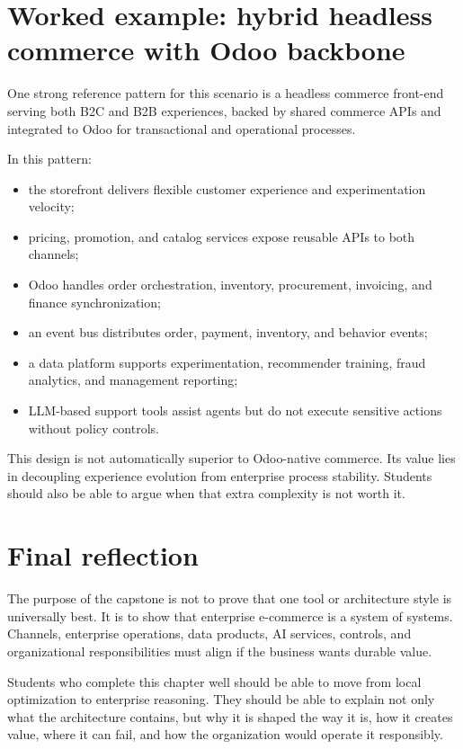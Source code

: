 \section{Worked example: hybrid headless commerce with Odoo backbone}
One strong reference pattern for this scenario is a headless commerce front-end serving both B2C and B2B experiences, backed by shared commerce APIs and integrated to Odoo for transactional and operational processes.

In this pattern:
\begin{itemize}
  \item the storefront delivers flexible customer experience and experimentation velocity;
  \item pricing, promotion, and catalog services expose reusable APIs to both channels;
  \item Odoo handles order orchestration, inventory, procurement, invoicing, and finance synchronization;
  \item an event bus distributes order, payment, inventory, and behavior events;
  \item a data platform supports experimentation, recommender training, fraud analytics, and management reporting;
  \item LLM-based support tools assist agents but do not execute sensitive actions without policy controls.
\end{itemize}

This design is not automatically superior to Odoo-native commerce. Its value lies in decoupling experience evolution from enterprise process stability. Students should also be able to argue when that extra complexity is not worth it.

\section{Final reflection}
The purpose of the capstone is not to prove that one tool or architecture style is universally best. It is to show that enterprise e-commerce is a system of systems. Channels, enterprise operations, data products, AI services, controls, and organizational responsibilities must align if the business wants durable value.

Students who complete this chapter well should be able to move from local optimization to enterprise reasoning. They should be able to explain not only what the architecture contains, but why it is shaped the way it is, how it creates value, where it can fail, and how the organization would operate it responsibly.

